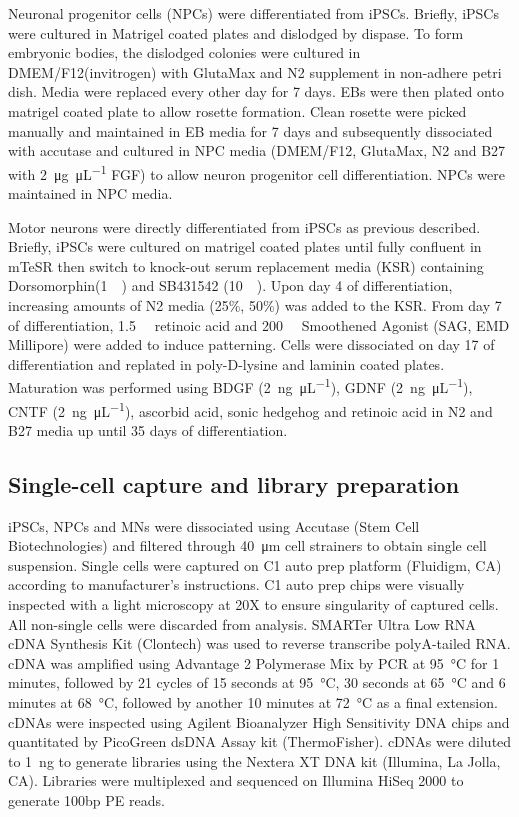 Neuronal progenitor cells (NPCs) were differentiated from iPSCs. Briefly, iPSCs were cultured in Matrigel coated plates and dislodged by dispase. To form embryonic bodies, the dislodged colonies were cultured in DMEM/F12(invitrogen) with GlutaMax and N2 supplement in non-adhere petri dish. Media were replaced every other day for 7 days. EBs were then plated onto matrigel coated plate to allow rosette formation. Clean rosette were picked manually and maintained in EB media for 7 days and subsequently dissociated with accutase and cultured in NPC media (DMEM/F12, GlutaMax, N2 and B27 with \SI[per-mode=symbol]{2}{\micro\gram\per\micro\liter} FGF) to allow neuron progenitor cell differentiation. NPCs were maintained in NPC media.

Motor neurons were directly differentiated from iPSCs as previous described\cite{Chambers:2009ey}. Briefly, iPSCs were cultured on matrigel coated plates until fully confluent in mTeSR then switch to knock-out serum replacement media (KSR) containing Dorsomorphin(\SI{1}{\micro\Molar}) and SB431542 (\SI{10}{\micro\Molar}). Upon day 4 of differentiation, increasing amounts of N2 media (25\%, 50\%) was added to the KSR. From day 7 of differentiation, \SI{1.5}{\micro\Molar} retinoic acid and \SI{200}{\nano\Molar} Smoothened Agonist (SAG, EMD Millipore) were added to induce patterning. Cells were dissociated on day 17 of differentiation and replated in poly-D-lysine and laminin coated plates. Maturation was performed using BDGF (\SI[per-mode=symbol]{2}{\nano\gram\per\micro\liter}), GDNF (\SI[per-mode=symbol]{2}{\nano\gram\per\micro\liter}), CNTF (\SI[per-mode=symbol]{2}{\nano\gram\per\micro\liter}), ascorbid acid, sonic hedgehog and retinoic acid in N2 and B27 media up until 35 days of differentiation.


\subsection{Single-cell capture and library preparation}

iPSCs, NPCs and MNs were dissociated using Accutase (Stem Cell Biotechnologies) and filtered through \SI{40}{\micro\meter} cell strainers to obtain single cell suspension. Single cells were captured on C1 auto prep platform (Fluidigm, CA) according to manufacturer’s instructions. C1 auto prep chips were visually inspected with a light microscopy at 20X to ensure singularity of captured cells. All non-single cells were discarded from analysis. SMARTer Ultra Low RNA cDNA Synthesis Kit (Clontech) was used to reverse transcribe polyA-tailed RNA. cDNA was amplified using Advantage 2 Polymerase Mix by PCR at \SI{95}{\degreeCelsius} for 1 minutes, followed by 21 cycles of 15 seconds at \SI{95}{\degreeCelsius}, 30 seconds at \SI{65}{\degreeCelsius} and 6 minutes at \SI{68}{\degreeCelsius}, followed by another 10 minutes at \SI{72}{\degreeCelsius} as a final extension. cDNAs were inspected using Agilent Bioanalyzer High Sensitivity DNA chips and quantitated by PicoGreen dsDNA Assay kit (ThermoFisher). cDNAs were diluted to \SI{1}{\nano\gram} to generate libraries using the Nextera XT DNA kit (Illumina, La Jolla, CA). Libraries were multiplexed and sequenced on Illumina HiSeq 2000 to generate 100bp PE reads.

